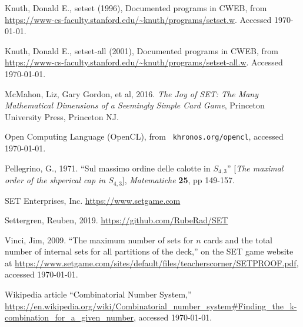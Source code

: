 \documentclass{article}
\theoremstyle{theorem}
\theoremstyle{definition}
\begin{document}
\begin{thebibliography}{9} %


Knuth, Donald E., {\sc setset} (1996), Documented programs in
  CWEB, from
  \url{https://www-cs-faculty.stanford.edu/~knuth/programs/setset.w}. Accessed
  \today.

Knuth, Donald E., {\sc setset-all} (2001), Documented
  programs in CWEB, from
  \url{https://www-cs-faculty.stanford.edu/~knuth/programs/setset-all.w}. Accessed
  \today.

 McMahon, Liz, Gary Gordon, et al, 2016. {\em The Joy of SET: The
  Many Mathematical Dimensions of a Seemingly Simple Card Game}, Princeton
  University Press, Princeton NJ.

 Open Computing Language (OpenCL), from {\tt
  khronos.org/opencl}, accessed \today.

Pellegrino, G., 1971. ``Sul massimo ordine delle calotte in
  $S_{4,3}$'' [{\em The maximal order of the shperical cap in $S_{4,3}$}], {\em
  Matematiche} {\bf 25}, pp 149-157.

 SET Enterprises, Inc. \url{https://www.setgame.com}

Settergren, Reuben, 2019. \url{https://github.com/RubeRad/SET}
  
Vinci, Jim, 2009. ``The maximum number of sets for $n$ cards and
  the total number of internal sets for all partitions of the deck,'' on the
  SET game website at
  \url{https://www.setgame.com/sites/default/files/teacherscorner/SETPROOF.pdf},
  accessed \today.

 Wikipedia article ``Combinatorial Number System,'' \url{https://en.wikipedia.org/wiki/Combinatorial_number_system#Finding_the_k-combination_for_a_given_number},
  accessed \today.

\end{thebibliography}
 
\end{document}
